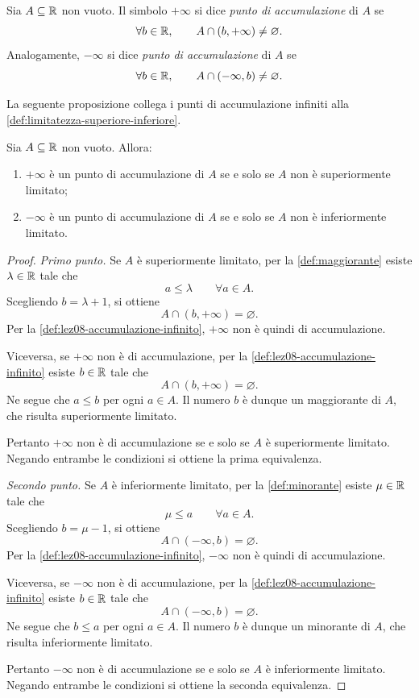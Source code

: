 \begin{definition}
\label{def:lez08-accumulazione-infinito}
Sia \(A\subseteq\mathbb{R}\) non vuoto. Il simbolo \(+\infty\) si dice
\emph{punto di accumulazione} di \(A\) se
\[
  \forall b\in\mathbb{R},\qquad A\cap(b,+\infty)\ne\varnothing.
\]
Analogamente, \(-\infty\) si dice \emph{punto di accumulazione}
di \(A\) se
\[
  \forall b\in\mathbb{R},\qquad A\cap(-\infty,b)\ne\varnothing.
\]
\end{definition}

\clearpage

La seguente proposizione collega i punti di accumulazione
infiniti alla \cref{def:limitatezza-superiore-inferiore}.

\begin{proposition}
\label{prop:lez08-accumulazione-limitatezza}
Sia \(A\subseteq\mathbb{R}\) non vuoto. Allora:
\begin{enumerate}
  \item \(+\infty\) è un punto di accumulazione di \(A\) se e solo
  se \(A\) non è superiormente limitato;
  \item \(-\infty\) è un punto di accumulazione di \(A\) se e solo
  se \(A\) non è inferiormente limitato.
\end{enumerate}
\end{proposition}

\begin{proof}
\emph{Primo punto.}
Se \(A\) è superiormente limitato, per la \cref{def:maggiorante}
esiste \(\lambda\in\mathbb{R}\) tale che
\[
  a\le\lambda \qquad \forall a\in A.
\]
Scegliendo \(b=\lambda+1\), si ottiene
\[
  A\cap(b,+\infty)=\varnothing.
\]
Per la \cref{def:lez08-accumulazione-infinito},
\(+\infty\) non è quindi di accumulazione.

Viceversa, se \(+\infty\) non è di accumulazione,
per la \cref{def:lez08-accumulazione-infinito}
esiste \(b\in\mathbb{R}\) tale che
\[
  A\cap(b,+\infty)=\varnothing.
\]
Ne segue che \(a\le b\) per ogni \(a\in A\).
Il numero \(b\) è dunque un maggiorante di \(A\),
che risulta superiormente limitato.

Pertanto \(+\infty\) non è di accumulazione
se e solo se \(A\) è superiormente limitato.
Negando entrambe le condizioni si ottiene
la prima equivalenza.

\emph{Secondo punto.}
Se \(A\) è inferiormente limitato, per la \cref{def:minorante}
esiste \(\mu\in\mathbb{R}\) tale che
\[
  \mu\le a \qquad \forall a\in A.
\]
Scegliendo \(b=\mu-1\), si ottiene
\[
  A\cap(-\infty,b)=\varnothing.
\]
Per la \cref{def:lez08-accumulazione-infinito},
\(-\infty\) non è quindi di accumulazione.

Viceversa, se \(-\infty\) non è di accumulazione,
per la \cref{def:lez08-accumulazione-infinito}
esiste \(b\in\mathbb{R}\) tale che
\[
  A\cap(-\infty,b)=\varnothing.
\]
Ne segue che \(b\le a\) per ogni \(a\in A\).
Il numero \(b\) è dunque un minorante di \(A\),
che risulta inferiormente limitato.

Pertanto \(-\infty\) non è di accumulazione
se e solo se \(A\) è inferiormente limitato.
Negando entrambe le condizioni si ottiene
la seconda equivalenza.
\end{proof}

